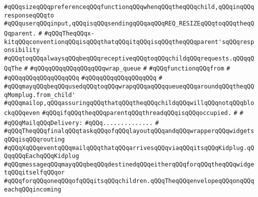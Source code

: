 \verb|#qQQqsizeqQQqpreferenceqQQqfunctionqQQqwhenqQQqtheqQQqchild,qQQqinqQQqresponseqQQqto|\newline
\verb|#qQQquserqQQqinput,qQQqisqQQqsendingqQQqaqQQqREQ_RESIZEqQQqtoqQQqtheqQQqparent.|\newline
\verb|#|\newline
\verb|#qQQqTheqQQqx-kitqQQqconventionqQQqisqQQqthatqQQqitqQQqisqQQqtheqQQqparent'sqQQqresponsibility|\newline
\verb|#qQQqtoqQQqalwaysqQQqbeqQQqreceptiveqQQqtoqQQqchildqQQqrequests.qQQqqQQqThe|\newline
\verb|#|\newline
\verb|#qQQqqQQqqQQqqQQqqQQqwrap_queue|\newline
\verb|#|\newline
\verb|#qQQqfunctionqQQqfrom|\newline
\verb|#|\newline
\verb|#qQQqqQQqqQQqqQQqqQQq|\newline
\verb|#qQQqqQQqqQQqqQQqqQQq|\newline
\verb|#|\newline
\verb|#qQQqmayqQQqbeqQQqusedqQQqtoqQQqwrapqQQqaqQQqqueueqQQqaroundqQQqtheqQQqMomplug.from_child'|\newline
\verb|#qQQqmailop,qQQqassuringqQQqthatqQQqtheqQQqchildqQQqwillqQQqnotqQQqblockqQQqeven|\newline
\verb|#qQQqifqQQqtheqQQqparentqQQqthreadqQQqisqQQqoccupied.|\newline
\verb|#|\newline
\verb|#|\newline
\verb|#qQQqMailqQQqDelivery:|\newline
\verb|#qQQq..............|\newline
\verb|#|\newline
\verb|#qQQqTheqQQqfinalqQQqtaskqQQqofqQQqlayoutqQQqandqQQqwrapperqQQqwidgetsqQQqisqQQqrouting|\newline
\verb|#qQQqXqQQqeventqQQqmailqQQqthatqQQqarrivesqQQqviaqQQqitsqQQqKidplug.qQQqqQQqEachqQQqKidplug|\newline
\verb|#qQQqmessageqQQqmayqQQqbeqQQqdestinedqQQqeitherqQQqforqQQqtheqQQqwidgetqQQqitselfqQQqor|\newline
\verb|#qQQqforqQQqoneqQQqofqQQqitsqQQqchildren.qQQqTheqQQqenvelopeqQQqonqQQqeachqQQqincoming|\newline
